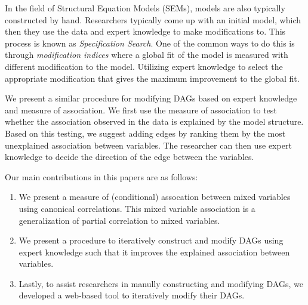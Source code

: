 \documentclass[letterpaper]{article} %
\begin{document}
In the field of Structural Equation Models (SEMs), models are also typically
constructed by hand. Researchers typically come up with an initial model, which
then they use the data and expert knowledge to make modifications to. This
process is known as \emph{Specification Search}. One of the common ways to do
this is through \emph{modification indices} where a global fit of the model is
measured with different modification to the model. Utilizing expert knowledge
to select the appropriate modification that gives the maximum improvement to
the global fit.

We present a similar procedure for modifying DAGs based on expert knowledge and
measure of association. We first use the measure of association to test whether
the association observed in the data is explained by the model structure. Based 
on this testing, we suggest adding edges by ranking them by the most unexplained
association between variables. The researcher can then use expert knowledge to 
decide the direction of the edge between the variables.

Our main contributions in this papers are as follows:
\begin{enumerate}
	\item We present a measure of (conditional) assocation between mixed variables using
		canonical correlations. This mixed variable association is a generalization 
		of partial correlation to mixed variables.
	\item We present a procedure to iteratively construct and modify DAGs using expert 
		knowledge such that it improves the explained association between variables.
	\item Lastly, to assist researchers in manully constructing and modifying DAGs,
		we developed a web-based tool to iteratively modify their DAGs.
\end{enumerate}
\end{document}
